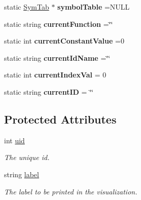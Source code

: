 \begin{DoxyCompactItemize}
\item 
\hypertarget{classAST_a163003bfe9c30510ec8039870346049f}{static \hyperlink{classSymTab}{Sym\-Tab} $\ast$ {\bfseries symbol\-Table} =N\-U\-L\-L}\label{classAST_a163003bfe9c30510ec8039870346049f}

\item 
\hypertarget{classAST_a5c3cc894d9c0453523dec9ed76f18a04}{static string {\bfseries current\-Function} =\char`\"{}\char`\"{}}\label{classAST_a5c3cc894d9c0453523dec9ed76f18a04}

\item 
\hypertarget{classAST_a66155513b59ff1a04c8ece8b20ec31f5}{static int {\bfseries current\-Constant\-Value} =0}\label{classAST_a66155513b59ff1a04c8ece8b20ec31f5}

\item 
\hypertarget{classAST_a3d031d7bab635ba1f015aade5943f40c}{static string {\bfseries current\-Id\-Name} =\char`\"{}\char`\"{}}\label{classAST_a3d031d7bab635ba1f015aade5943f40c}

\item 
\hypertarget{classAST_a16c4b6e54febc1a26b31a64a46972ef0}{static int {\bfseries current\-Index\-Val} = 0}\label{classAST_a16c4b6e54febc1a26b31a64a46972ef0}

\item 
\hypertarget{classAST_a6fc65ae9dd064a88941d4b88669b19db}{static string {\bfseries current\-I\-D} = \char`\"{}\char`\"{}}\label{classAST_a6fc65ae9dd064a88941d4b88669b19db}

\end{DoxyCompactItemize}
\subsection*{Protected Attributes}
\begin{DoxyCompactItemize}
\item 
\hypertarget{classAST_a847b778f1c3dd5a19de32de432ee6e15}{int \hyperlink{classAST_a847b778f1c3dd5a19de32de432ee6e15}{uid}}\label{classAST_a847b778f1c3dd5a19de32de432ee6e15}

\begin{DoxyCompactList}\small\item\em The unique id. \end{DoxyCompactList}\item 
\hypertarget{classAST_ab2e239ccc0688d2341724432ff5a1a31}{string \hyperlink{classAST_ab2e239ccc0688d2341724432ff5a1a31}{label}}\label{classAST_ab2e239ccc0688d2341724432ff5a1a31}

\begin{DoxyCompactList}\small\item\em The label to be printed in the visualization. \end{DoxyCompactList}\end{DoxyCompactItemize}


